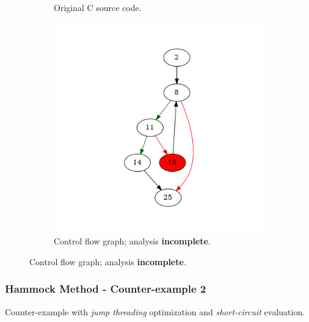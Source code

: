 \begin{figure}[htbp]
	\centering
	\begin{subfigure}[b]{0.48\textwidth}
		\centering
		
		\caption{Original C source code.}
	\end{subfigure}
	\begin{subfigure}[b]{0.50\textwidth}
		\centering
		\includegraphics[width=\textwidth]{inc/appendices/examples/hammock/counter-example/with-break/main_0001b.png}
		\caption{Control flow graph; analysis \textbf{incomplete}.}
	\end{subfigure}
\end{figure}


\clearpage

\subsubsection{Hammock Method - Counter-example 2}

Counter-example with \textit{jump threading} optimization and \textit{short-circuit} evaluation.

